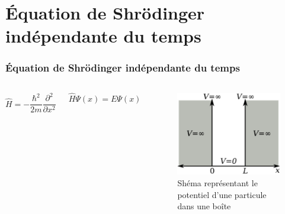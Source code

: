 \documentclass[aspectratio=169]{beamer}
\begin{document}
\section{Équation de Shrödinger indépendante du temps}
\begin{frame}
\frametitle{Équation de Shrödinger indépendante du temps}

\begin{columns}

\begin{equation}\tag{3}
\hat{H}=-\frac{\hbar^2}{2m}\frac{\partial^2}{\partial x^2}
\end{equation} 

\begin{equation}\tag{4}
\hat{H}\Psi(x)=E\Psi(x)
\end{equation} 

\begin{figure}
\includegraphics[scale=0.4]{Pot}
\caption{Shéma représentant le potentiel d'une particule dans une boîte}
\end{figure}
\end{columns}

\end{frame}
\end{document}
